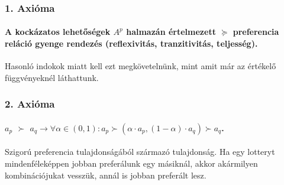 \documentclass[a4paper,12pt]{article}
\begin{document}

\subsubsection{1. Axióma}
\paragraph{A kockázatos lehetőségek $A^p$ halmazán értelmezett $\succeq$ preferencia reláció gyenge rendezés (reflexivitás, tranzitivitás, teljesség).}

Hasonló indokok miatt kell ezt megkövetelnünk, mint amit már az értékelő függvényeknél láthattunk.

\subsubsection{2. Axióma}
\paragraph{$a_p$  $\succ$ $a_q \rightarrow \forall \alpha \in (0,1): a_p \succ (\alpha\cdot a_p , (1-\alpha)\cdot a_q ) \succ a_q$.} 
Szigorú preferencia tulajdonságából származó tulajdonság. Ha egy lotteryt mindenféleképpen jobban preferálunk egy másiknál, akkor akármilyen kombinációjukat vesszük, annál is jobban preferált lesz.
\end{document}
